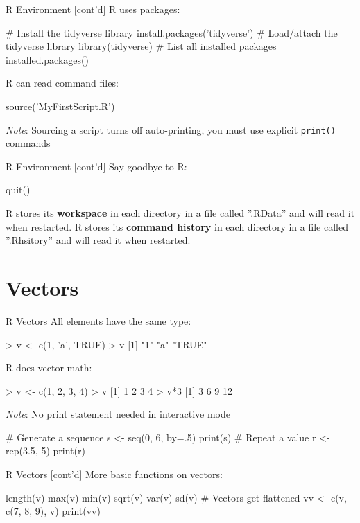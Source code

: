 \documentclass[ignorenonframetext,xcolor=x11names]{beamer}
\begin{document}
\begin{frame}[label=full,fragile]{R Environment \small [cont'd]}
R uses packages:
\begin{Rcode}
# Install the tidyverse library
install.packages('tidyverse')
# Load/attach the tidyverse library
library(tidyverse)
# List all installed packages
installed.packages()
\end{Rcode}
R can read command files:
\begin{Rcode}
source('MyFirstScript.R')
\end{Rcode}
\emph{Note}: Sourcing a script turns off auto-printing, you must use explicit \texttt{print()} commands
\end{frame}

\begin{frame}[label=full,fragile]{R Environment \small [cont'd]}
Say goodbye to R:
\begin{Rcode}
quit()
\end{Rcode}
R stores its \textbf{workspace} in each directory in a file called ''.RData'' and will read it when restarted. R stores its \textbf{command history} in each directory in a file called ''.Rhsitory'' and will read it when restarted.
\end{frame}

\section{Vectors}

\begin{frame}[label=full,fragile]{R Vectors}
All elements have the same type:
\begin{Rcode}
> v <- c(1, 'a', TRUE)
> v
[1] "1"    "a"    "TRUE"
\end{Rcode}
R does vector math:
\begin{Rcode}
> v <- c(1, 2, 3, 4)
> v
[1] 1 2 3 4
> v*3
[1]  3  6  9 12
\end{Rcode}
\emph{Note}: No print statement needed in interactive mode

\begin{Rcode}
# Generate a sequence
s <- seq(0, 6, by=.5)
print(s)
# Repeat a value
r <- rep(3.5, 5)
print(r)
\end{Rcode}
\end{frame}

\begin{frame}[label=full,fragile]{R Vectors \small [cont'd]}
More basic functions on vectors:
\begin{Rcode}
length(v)
max(v)
min(v)
sqrt(v)
var(v)
sd(v)
# Vectors get flattened
vv <- c(v, c(7, 8, 9), v)
print(vv)
\end{Rcode}
\end{frame}
\end{document}
